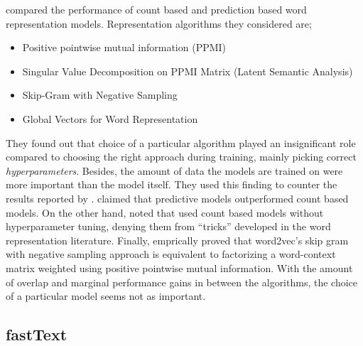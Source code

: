 
\textcite{levy_improving_2015} compared the performance of count based and prediction based word representation models.
Representation algorithms they considered are;
\begin{itemize}
    \item Positive pointwise mutual information (PPMI)~\cite{church_word_1990, bullinaria_extracting_2007}
    \item Singular Value Decomposition on PPMI Matrix (Latent Semantic Analysis)~\cite{deerwester_indexing_1990}
    \item Skip-Gram with Negative Sampling~\cite{mikolovDistributed2013}
    \item Global Vectors for Word Representation~\cite{pennington_glove_2014}
\end{itemize}
They found out that choice of a particular algorithm played an insignificant role compared to choosing the right approach during training, mainly picking correct \emph{hyperparameters}.
Besides, the amount of data the models are trained on were more important than the model itself.
They used this finding to counter the results reported by \textcite{baroni_dont_2014}.
\citeauthor{baroni_dont_2014} claimed that predictive models outperformed count based models.
On the other hand, \citeauthor{levy_improving_2015} noted that \citeauthor{baroni_dont_2014} used count based models without hyperparameter tuning, denying them from \enquote{tricks} developed in the word representation literature.
Finally, \textcite{levy_neural_2014} emprically proved that word2vec's skip gram with negative sampling approach is equivalent to factorizing a word-context matrix weighted using positive pointwise mutual information.
With the amount of overlap and marginal performance gains in between the algorithms, the choice of a particular model seems not as important.

\subsection{fastText}%
\label{sub:fasttext}

